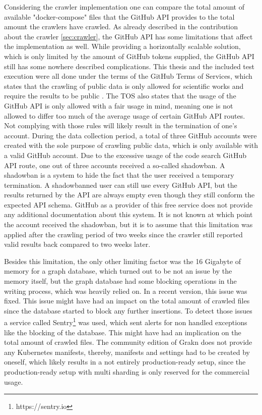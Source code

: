 Considering the crawler implementation one can compare the total amount of available "docker-compose" files that the GitHub API provides to the total amount the crawlers have crawled. As already described in the contribution about the crawler \ref{sec:crawler}, the GitHub API has some limitations that affect the implementation as well. While providing a horizontally scalable solution, which is only limited by the amount of GitHub tokens supplied, the GitHub API still has some nowhere described complications. This thesis and the included test execution were all done under the terms of the GitHub Terms of Services, which states that the crawling of public data is only allowed for scientific works and require the results to be public . The TOS also states that the usage of the GitHub API is only allowed with a fair usage in mind, meaning one is not allowed to differ too much of the average usage of certain GitHub API routes. Not complying with those rules will likely result in the termination of one's account. During the data collection period, a total of three GitHub accounts were created with the sole purpose of crawling public data, which is only available with a valid GitHub account. Due to the excessive usage of the code search GitHub API route, one out of three accounts received a so-called shadowban. A shadowban is a system to hide the fact that the user received a temporary termination. A shadowbanned user can still use every GitHub API, but the results returned by the API are always empty even though they still conform the expected API schema. GitHub as a provider of this free service does not provide any additional documentation about this system. It is not known at which point the account received the shadowban, but it is to assume that this limitation was applied after the crawling period of two weeks since the crawler still reported valid results back compared to two weeks later.

Besides this limitation, the only other limiting factor was the 16 Gigabyte of memory for a graph database, which turned out to be not an issue by the memory itself, but the graph database had some blocking operations in the writing process, which was heavily relied on. In a recent version, this issue was fixed. This issue might have had an impact on the total amount of crawled files since the database started to block any further insertions. To detect those issues a service called Sentry\footnote{https://sentry.io} was used, which sent alerts for non handled exceptions like the blocking of the database. This might have had an implication on the total amount of crawled files. The community edition of Grakn does not provide any Kubernetes manifests, thereby, manifests and settings had to be created by oneself, which likely results in a not entirely production-ready setup, since the production-ready setup with multi sharding is only reserved for the commercial usage.

